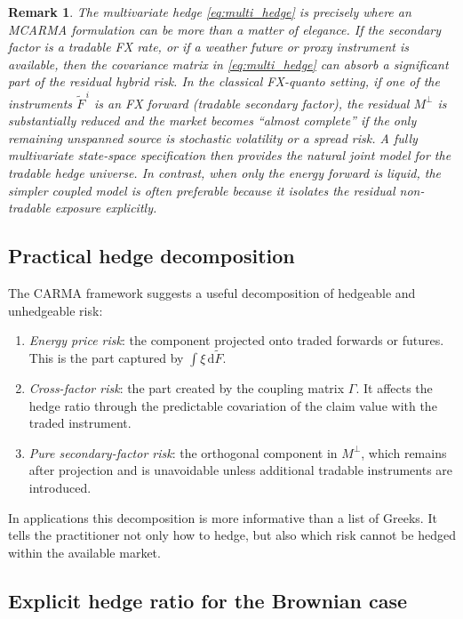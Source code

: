 \documentclass[10pt,a4paper,reqno]{amsart}
\newtheorem{remark}[theorem]{Remark}
\newcommand{\1}{\mathbbm{1}}
\newcommand{\dd}{\mathrm{d}}
\begin{document}
\begin{remark}
The multivariate hedge \eqref{eq:multi_hedge} is precisely where an MCARMA
formulation can be more than a matter of elegance. If the secondary factor is a
tradable FX rate, or if a weather future or proxy instrument is available, then
the covariance matrix in \eqref{eq:multi_hedge} can absorb a significant part of
the residual hybrid risk. In the classical FX-quanto setting, if one of the
instruments $\widetilde{F}^{\,i}$ is an FX forward (tradable secondary factor),
the residual $M^{\perp}$ is substantially reduced and the market becomes
``almost complete'' if the only remaining unspanned source is stochastic
volatility or a spread risk. A fully multivariate state-space specification then
provides the natural joint model for the tradable hedge universe. In contrast,
when only the energy forward is liquid, the simpler coupled model is often
preferable because it isolates the residual non-tradable exposure explicitly.
\end{remark}

\subsection{Practical hedge decomposition}

The CARMA framework suggests a useful decomposition of hedgeable and unhedgeable
risk:
\begin{enumerate}[label=(\roman*)]
  \item \emph{Energy price risk}: the component projected onto traded forwards or
    futures. This is the part captured by $\int \xi\,\dd \widetilde{F}$.
  \item \emph{Cross-factor risk}: the part created by the coupling matrix
    $\Gamma$. It affects the hedge ratio through the predictable covariation of
    the claim value with the traded instrument.
  \item \emph{Pure secondary-factor risk}: the orthogonal component in
    $M^{\perp}$, which remains after projection and is unavoidable unless
    additional tradable instruments are introduced.
\end{enumerate}
In applications this decomposition is more informative than a list of Greeks.
It tells the practitioner not only how to hedge, but also which risk cannot be
hedged within the available market.

\subsection{Explicit hedge ratio for the Brownian case}
\end{document}
